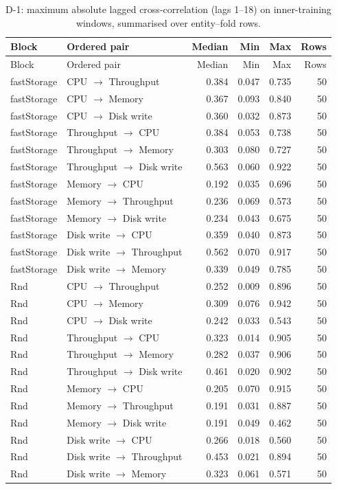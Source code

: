 \documentclass[a4paper,11pt]{article}
\begin{document}
\begin{longtable}{@{}llrrrr@{}}
\caption{D-1: maximum absolute lagged cross-correlation (lags 1--18) on inner-training windows, summarised over entity--fold rows.}\label{tab:supp-t2-d1}\\
\toprule
Block & Ordered pair & Median & Min & Max & Rows \\
\midrule
\endfirsthead
\toprule
Block & Ordered pair & Median & Min & Max & Rows \\
\midrule
\endhead
\bottomrule
\endfoot
fastStorage & CPU $\rightarrow$ Throughput & 0.384 & 0.047 & 0.735 & 50 \\
fastStorage & CPU $\rightarrow$ Memory & 0.367 & 0.093 & 0.840 & 50 \\
fastStorage & CPU $\rightarrow$ Disk write & 0.360 & 0.032 & 0.873 & 50 \\
fastStorage & Throughput $\rightarrow$ CPU & 0.384 & 0.053 & 0.738 & 50 \\
fastStorage & Throughput $\rightarrow$ Memory & 0.303 & 0.080 & 0.727 & 50 \\
fastStorage & Throughput $\rightarrow$ Disk write & 0.563 & 0.060 & 0.922 & 50 \\
fastStorage & Memory $\rightarrow$ CPU & 0.192 & 0.035 & 0.696 & 50 \\
fastStorage & Memory $\rightarrow$ Throughput & 0.236 & 0.069 & 0.573 & 50 \\
fastStorage & Memory $\rightarrow$ Disk write & 0.234 & 0.043 & 0.675 & 50 \\
fastStorage & Disk write $\rightarrow$ CPU & 0.359 & 0.040 & 0.873 & 50 \\
fastStorage & Disk write $\rightarrow$ Throughput & 0.562 & 0.070 & 0.917 & 50 \\
fastStorage & Disk write $\rightarrow$ Memory & 0.339 & 0.049 & 0.785 & 50 \\
Rnd & CPU $\rightarrow$ Throughput & 0.252 & 0.009 & 0.896 & 50 \\
Rnd & CPU $\rightarrow$ Memory & 0.309 & 0.076 & 0.942 & 50 \\
Rnd & CPU $\rightarrow$ Disk write & 0.242 & 0.033 & 0.543 & 50 \\
Rnd & Throughput $\rightarrow$ CPU & 0.323 & 0.014 & 0.905 & 50 \\
Rnd & Throughput $\rightarrow$ Memory & 0.282 & 0.037 & 0.906 & 50 \\
Rnd & Throughput $\rightarrow$ Disk write & 0.461 & 0.020 & 0.902 & 50 \\
Rnd & Memory $\rightarrow$ CPU & 0.205 & 0.070 & 0.915 & 50 \\
Rnd & Memory $\rightarrow$ Throughput & 0.191 & 0.031 & 0.887 & 50 \\
Rnd & Memory $\rightarrow$ Disk write & 0.191 & 0.049 & 0.462 & 50 \\
Rnd & Disk write $\rightarrow$ CPU & 0.266 & 0.018 & 0.560 & 50 \\
Rnd & Disk write $\rightarrow$ Throughput & 0.453 & 0.021 & 0.894 & 50 \\
Rnd & Disk write $\rightarrow$ Memory & 0.323 & 0.061 & 0.571 & 50 \\
\end{longtable}
\end{document}
